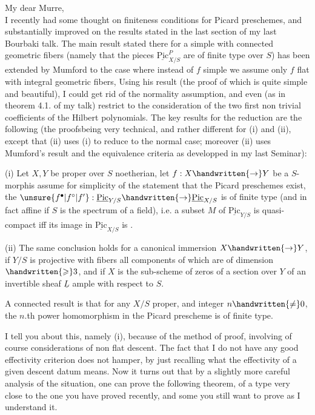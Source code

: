 My dear Murre,\\

I recently had some thought on finiteness conditions for Picard preschemes, and substantially improved on the results stated in the last section of my last Bourbaki talk. The main result stated there for a simple  with connected geometric fibers (namely that the pieces $\underline{\mathrm{Pic}}^{P}_{X/S}$ are of finite type over $S$) has been extended by Mumford to the case where  instead of $f$ simple we assume only $f$ flat with integral geometric fibers, Using his result (the proof of which is quite simple and beautiful), I could get rid of the normality assumption, and even (as in theorem 4.1. of my talk) restrict to the consideration of the two first non trivial coefficients of the Hilbert polynomials. The key results for the reduction are the following (the proofsbeing very technical, and rather different for (i) and (ii), except that (ii) uses (i) to reduce to the normal case; moreover (ii) uses Mumford's result and the equivalence criteria as developped in my last Seminar):

(i) Let $X,Y$ be proper over $S$ noetherian, let $f:X\handwritten{\to}Y$ be a  $S$-morphis  assume for simplicity of the statement that the Picard preschemes exist, the $\unsure{f^{\bullet}|f^{\circ}|f'}:\underline{\mathrm{Pic}}_{Y/S}\handwritten{\to}\underline{\mathrm{Pic}}_{X/S}$ is of finite type (and in fact affine if $S$ is the spectrum of a field), i.e. a subset $M$ of $\underline{\mathrm{Pic}}_{Y/S}$ is quasi-compact iff its image in $\underline{\mathrm{Pic}}_{X/S}$ is .

(ii) The same conclusion holds for a canonical immersion $X\handwritten{\to}Y$, if $Y/S$ is projective with fibers all components of which are of dimension $\handwritten{\geqslant}3$, and if $X$ is the sub-scheme of zeros of a section over $Y$ of an invertible sheaf $\underline{L}$ ample with respect to $S$.

A connected result is that for any $X/S$ proper, and integer $n\handwritten{\ne}0$,
the $n$.th power homomorphism in the Picard prescheme is of finite type.

I tell you about this, namely (i), because of the method of proof, involving of course considerations of non flat descent. The fact that I do not have any good effectivity criterion does not hamper, by just recalling what the effectivity of a given descent datum means.  Now it turns out that by a slightly more careful analysis of the situation, one can prove the following theorem, of a type very close to the one you have proved recently, and  some you still want to prove as I understand it\deleted{\unsure{:}}.

